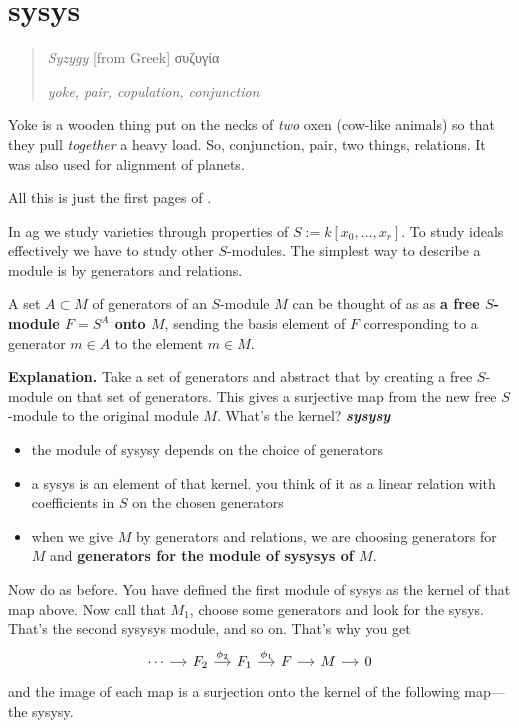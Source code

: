 \section{sysys}

\begin{quote}
\hfill \textit{Syzygy} \textnormal{[from Greek]} \textgreek{συζυγία}

\hfill\textit{yoke, pair, copulation, conjunction}
\end{quote}

Yoke is a wooden thing put on the necks of \textit{two} oxen (cow-like animals) so that they pull \textit{together} a heavy load. So, conjunction, pair, two things, relations. It was also used for alignment of planets.

All this is just the first pages of \cite{sys}.

In ag we study varieties through properties of \(S:=k[x_0,\ldots,x_r]\). To study ideals effectively we have to study other \(S\)-modules. The simplest way to describe a module is by generators and relations.

A set \(A \subset M\) of generators of an \(S\)-module \(M\) can be thought of as as \textbf{a free \(S\)-module \(F=S^A\) onto \(M\)}, sending the basis element of \(F\) corresponding to a generator \(m \in A\) to the element \(m \in M\).

\textbf{Explanation.} Take a set of generators and abstract that by creating a free \(S\)-module on that set of generators. This gives a surjective map from the new free \(S\)-module to the original module \(M\). What's the kernel? \textit{\textbf{sysysy}}

\begin{itemize}
\item the module of sysysy depends on the choice of generators
\item a sysys is an element of that kernel. you think of it as a linear relation with coefficients in \(S\) on the chosen generators
\item when we give \(M\) by generators and relations, we are choosing generators for \(M\) and \textbf{generators for the module of sysysys of \(M\)}.
\end{itemize}

Now do as before. You have defined the first module of sysys as the kernel of that map above. Now call that \(M_1\), choose some generators and look for the sysys. That's the second sysysys module, and so on. That's why you get
\[\begin{tikzcd}[column sep=small]
	\cdots\arrow[r]&F_2\arrow[r,"\phi_2"]&F_1\arrow[r,"\phi_1"]&F\arrow[r]&M\arrow[r]&0
\end{tikzcd}\]
and the image of each map is a surjection onto the kernel of the following map---the sysysy.

